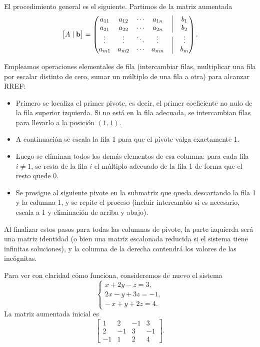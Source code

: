 El procedimiento general es el siguiente. Partimos de la matriz aumentada
\[
\bigl[A\mid \mathbf b\bigr]=
\begin{pmatrix}
a_{11} & a_{12} & \cdots & a_{1n} & \bigm| & b_1\\
a_{21} & a_{22} & \cdots & a_{2n} & \bigm| & b_2\\
\vdots & \vdots & \ddots & \vdots & \bigm| & \vdots\\
a_{m1} & a_{m2} & \cdots & a_{mn} & \bigm| & b_m
\end{pmatrix}.
\]

Empleamos operaciones elementales de fila (intercambiar filas, multiplicar una fila por escalar distinto de cero, sumar un múltiplo de una fila a otra) para alcanzar RREF:
\begin{itemize}
  \item Primero se localiza el primer pivote, es decir, el primer coeficiente no nulo de la fila superior izquierda. Si no está en la fila adecuada, se intercambian filas para llevarlo a la posición \((1,1)\).
  \item A continuación se escala la fila 1 para que el pivote valga exactamente 1.
  \item Luego se eliminan todos los demás elementos de esa columna: para cada fila \(i\neq1\), se resta de la fila \(i\) el múltiplo adecuado de la fila 1 de forma que el resto quede 0.
  \item Se prosigue al siguiente pivote en la submatriz que queda descartando la fila 1 y la columna 1, y se repite el proceso (incluir intercambio si es necesario, escala a 1 y eliminación de arriba y abajo).
\end{itemize}

Al finalizar estos pasos para todas las columnas de pivote, la parte izquierda será una matriz identidad (o bien una matriz escalonada reducida si el sistema tiene infinitas soluciones), y la columna de la derecha contendrá los valores de las incógnitas.

Para ver con claridad cómo funciona, consideremos de nuevo el sistema
\[
\begin{cases}
x + 2y - z = 3,\\
2x - y + 3z = -1,\\
-\,x + y + 2z = 4.
\end{cases}
\]
La matriz aumentada inicial es
\[
\left[\begin{array}{ccc|c}
1 & 2 & -1 & 3\\
2 & -1 & 3 & -1\\
-1 & 1 & 2 & 4
\end{array}\right].
\]


